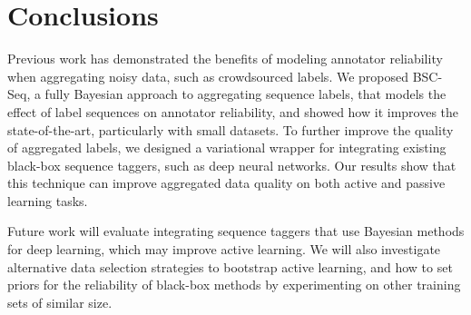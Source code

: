 \section{Conclusions}

Previous work has demonstrated the benefits of modeling annotator reliability when aggregating noisy data, 
such as crowdsourced labels. 
We proposed BSC-Seq, a fully Bayesian approach to aggregating sequence labels, 
that models the effect of label sequences on annotator reliability,
and showed how it improves the state-of-the-art, particularly with small datasets.
To further improve the quality of aggregated labels,
we designed a variational wrapper for integrating existing black-box 
sequence taggers, such as deep neural networks.
Our results show that this technique can improve aggregated data quality
on both active and passive learning tasks.

Future work will evaluate integrating sequence taggers that use
Bayesian methods for deep learning, 
which may improve active learning.
We will also investigate
alternative data selection strategies to bootstrap active learning, 
and how to set priors for %
the reliability of black-box methods by experimenting
on other training sets of similar size.


